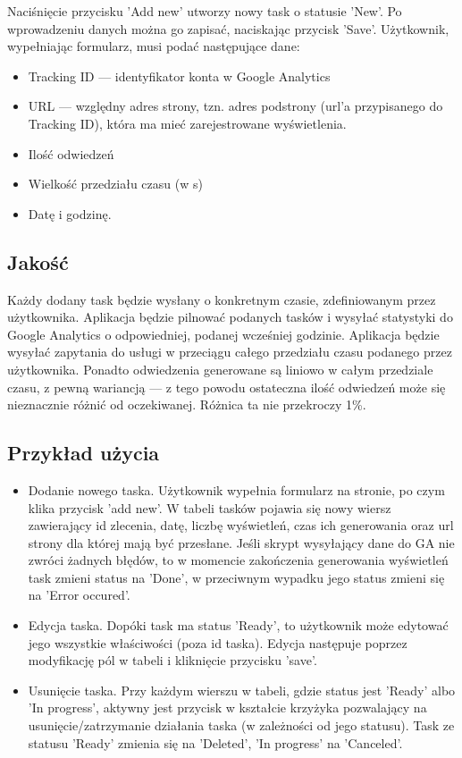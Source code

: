 \documentclass{article}
\begin{document}
    Naciśnięcie przycisku 'Add new' utworzy nowy task o statusie 'New'. Po wprowadzeniu danych można go zapisać, naciskając przycisk 'Save'. Użytkownik, wypełniając formularz, musi podać następujące dane:
    
    \begin{itemize}
    \item Tracking ID --- identyfikator konta w Google Analytics
    \item URL --- względny adres strony, tzn. adres podstrony (url'a przypisanego do Tracking ID), która ma mieć zarejestrowane wyświetlenia.
    \item Ilość odwiedzeń
    \item Wielkość przedziału czasu (w s)
    \item Datę i godzinę.
    \end{itemize}

    \vspace{1\baselineskip}
    
    \subsection{Jakość}
    Każdy dodany task będzie wysłany o konkretnym czasie, zdefiniowanym przez użytkownika. Aplikacja będzie pilnować podanych tasków i wysyłać statystyki do Google Analytics o odpowiedniej, podanej wcześniej godzinie. Aplikacja będzie wysyłać zapytania do usługi w przeciągu całego przedziału czasu podanego przez użytkownika. Ponadto odwiedzenia generowane są liniowo w całym przedziale czasu, z pewną wariancją --- z tego powodu ostateczna ilość odwiedzeń może się nieznacznie różnić od oczekiwanej. Różnica ta nie przekroczy 1\%.

    \vspace{2\baselineskip}
    
    \subsection{Przykład użycia}
    \begin{itemize}
    \item Dodanie nowego taska. Użytkownik wypełnia formularz na stronie, po czym klika przycisk 'add new'. W tabeli tasków pojawia się nowy wiersz zawierający
        id zlecenia, datę, liczbę wyświetleń, czas ich generowania oraz url strony dla której mają być przesłane. Jeśli skrypt wysyłający dane do GA nie zwróci żadnych błędów, to w momencie zakończenia generowania wyświetleń task zmieni status na 'Done', w przeciwnym wypadku jego status zmieni się na 'Error occured'.
    \item Edycja taska. Dopóki task ma status 'Ready', to użytkownik może edytować jego wszystkie właściwości (poza id taska). Edycja następuje poprzez modyfikację pól w tabeli i kliknięcie przycisku 'save'.
    \item Usunięcie taska. Przy każdym wierszu w tabeli, gdzie status jest 'Ready' albo 'In progress', aktywny jest przycisk w kształcie krzyżyka pozwalający na usunięcie/zatrzymanie działania taska (w zależności od jego statusu). Task ze statusu 'Ready' zmienia się na 'Deleted', 'In progress' na 'Canceled'.
    \end{itemize}
    
\end{document}
